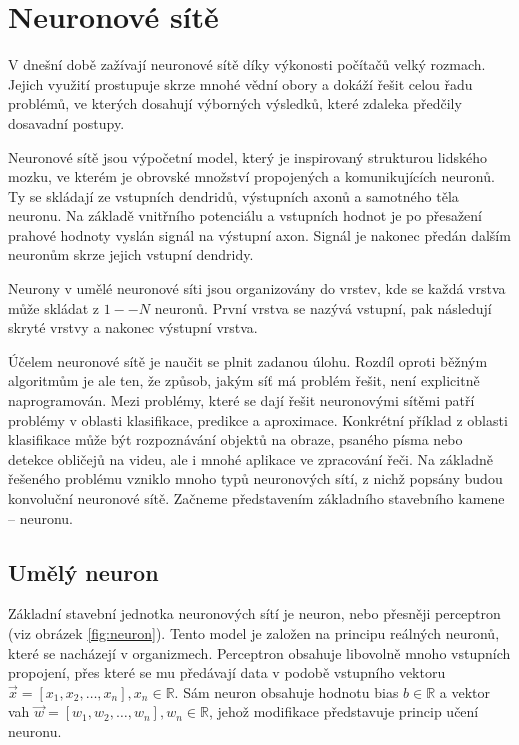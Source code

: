 \chapter{Neuronové sítě}
\label{neuronovky}
V dnešní době zažívají neuronové sítě díky výkonosti počítačů velký rozmach. Jejich využití prostupuje skrze mnohé vědní obory a dokáží řešit celou řadu problémů, ve kterých dosahují výborných výsledků, které zdaleka předčily dosavadní postupy. 

Neuronové sítě jsou výpočetní model, který je inspirovaný strukturou lidského mozku, ve kterém je obrovské množství propojených a komunikujících neuronů. Ty se skládají ze vstupních dendridů, výstupních axonů a samotného těla neuronu. Na základě vnitřního potenciálu a vstupních hodnot je po přesažení prahové hodnoty vyslán signál na výstupní axon. Signál je nakonec předán dalším neuronům skrze jejich vstupní dendridy\cite[p.~65--66]{mitdeeplearning_small}.

Neurony v umělé neuronové síti jsou organizovány do vrstev, kde se každá vrstva může skládat z $1--N$ neuronů. První vrstva se nazývá vstupní, pak následují skryté vrstvy a nakonec výstupní vrstva.	

Účelem neuronové sítě je naučit se plnit zadanou úlohu. Rozdíl oproti běžným algoritmům je ale ten, že způsob, jakým síť má problém řešit, není explicitně naprogramován. Mezi problémy, které se dají řešit neuronovými sítěmi patří problémy v oblasti klasifikace, predikce a aproximace. Konkrétní příklad z oblasti klasifikace může být rozpoznávání objektů na obraze, psaného písma nebo detekce obličejů na videu, ale i mnohé aplikace ve zpracování řeči. Na základně řešeného problému vzniklo mnoho typů neuronových sítí, z nichž popsány budou konvoluční neuronové sítě. Začneme představením základního stavebního kamene -- neuronu.

\section{Umělý neuron}
Základní stavební jednotka neuronových sítí je neuron, nebo přesněji perceptron (viz obrázek \ref{fig:neuron}). Tento model je založen na principu reálných neuronů, které se nacházejí v organizmech. Perceptron obsahuje libovolně mnoho vstupních propojení, přes které se mu předávají data v podobě vstupního vektoru $\overrightarrow{x} = [x_1, x_2, \dots, x_n], x_n \in \mathbb{R}$. Sám neuron obsahuje hodnotu bias $b \in \mathbb{R}$ a vektor vah $\overrightarrow{w} = [w_1, w_2, \dots, w_n], w_n \in \mathbb{R}$, jehož modifikace představuje princip učení neuronu.

